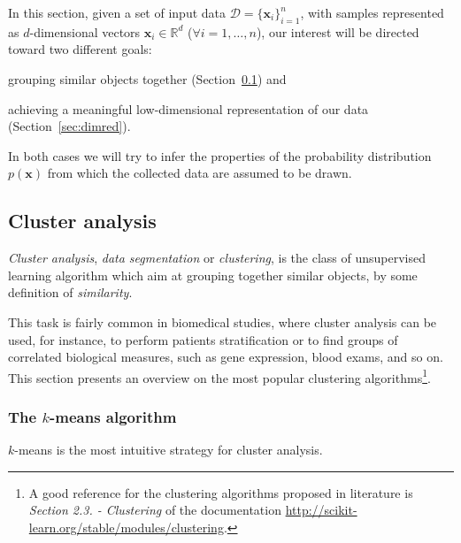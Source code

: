   In this section, given a set of input data $\mathcal{D}=\{\bm{x}_i\}_{i=1}^n$, with samples represented as $d$-dimensional vectors $\bm{x}_i \in \mathbb{R}^d$ ($\forall i=1,\dots,n$), our interest will be directed toward two different goals:
  \begin{enumerate*}[label=(\roman*)]
  	\item grouping similar objects together (Section~\ref{sec:clustering}) and
  	\item achieving a meaningful low-dimensional representation of our data (Section~\ref{sec:dimred}).
  \end{enumerate*}
  In both cases we will try to infer the properties of the probability distribution $p(\bm{x})$ from which the collected data are assumed to be drawn.
  
    \subsection{Cluster analysis} \label{sec:clustering}
    \textit{Cluster analysis}, \aka \textit{data segmentation} or \textit{clustering}, is the class of unsupervised learning algorithm which aim at grouping together similar objects, by some definition of \textit{similarity}.
        
    This task is fairly common in biomedical studies, where cluster analysis can be used, for instance, to perform patients stratification or to find groups of correlated biological measures, such as gene expression, blood exams, and so on. This section presents an overview on the most popular clustering algorithms\footnote{ A good reference for the clustering algorithms proposed in literature is \textit{Section 2.3. - Clustering} of the \sklearn documentation \url{http://scikit-learn.org/stable/modules/clustering}.}.

    \subsubsection{The $k$-means algorithm} \label{sec:k-means}
    $k$-means is the most intuitive strategy for cluster analysis.
    
